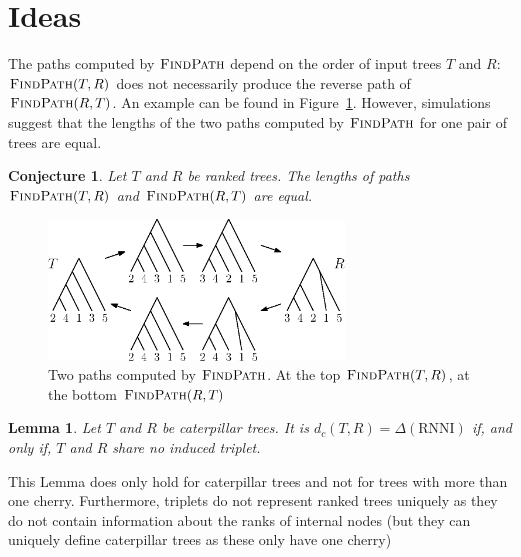 \documentclass{amsart}
\newcommand{\rnni}{\mathrm{RNNI}}
\newcommand{\findpath}{\textsc{FindPath}}
\newtheorem{conjecture}[definition]{Conjecture}
\newtheorem{lemma}[definition]{Lemma}
\begin{document}
\section{Ideas}


The paths computed by $\findpath$ depend on the order of input trees $T$ and $R$:
$\findpath(T,R)$ does not necessarily produce the reverse path of $\findpath(R,T)$.
An example can be found in Figure~\ref{fig:findpath_not_symmetric}.
However, simulations suggest that the lengths of the two paths computed by $\findpath$ for one pair of trees are equal.

\begin{conjecture}
    Let $T$ and $R$ be ranked trees.
    The lengths of paths $\findpath(T,R)$ and $\findpath(R,T)$ are equal.
\end{conjecture}

\begin{figure}[H]
	\centering
	\includegraphics[width=0.7\textwidth]{findpath_not_symmetric}
    \vspace{2pt}
	\caption{Two paths computed by $\findpath$. At the top $\findpath(T,R)$, at the bottom $\findpath(R,T)$}
	\label{fig:findpath_not_symmetric}
\end{figure}

\begin{lemma}
    Let $T$ and $R$ be caterpillar trees.
    It is $d_c(T,R) = \Delta(\rnni)$ if, and only if, $T$ and $R$ share no induced triplet.
\end{lemma}

This Lemma does only hold for caterpillar trees and not for trees with more than one cherry.
Furthermore, triplets do not represent ranked trees uniquely as they do not contain information about the ranks of internal nodes (but they can uniquely define caterpillar trees as these only have one cherry)
\end{document}
